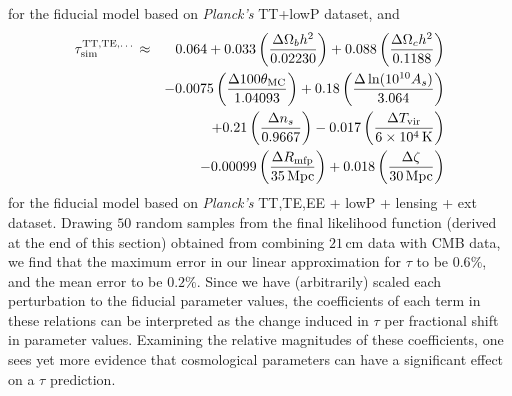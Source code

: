 \documentclass[twocolumn,aps,prd,nofootinbib,showpacs,superscriptaddress]{revtex4-1}
\begin{document}
for the fiducial model based on \emph{Planck's} TT+lowP dataset, and
\begin{eqnarray}
\label{eq:TTTEEE_linearTau}
\tau_\textrm{sim}^\textrm{TT,TE,\dots} \approx &&\, 0.064 + 0.033  \left(\frac{\Delta\Omega_b h^2}{0.02230}\right) + 0.088\left(\frac{\Delta\Omega_c h^2}{0.1188}\right) \nonumber\\ 
&&  -0.0075 \left(\frac{\Delta100\theta_\textrm{MC}}{1.04093}\right) +   0.18\left(\frac{\Delta\ln (10^{10} A_s)}{3.064}\right)\nonumber \\
&& +   0.21 \left(\frac{\Delta n_s}{0.9667}\right)  -0.017 \left(\frac{\Delta T_\textrm{vir}}{6 \times 10^4\,\textrm{K}}\right)\nonumber \\
&& -0.00099 \left(\frac{\Delta R_\textrm{mfp}}{35\,\textrm{Mpc}}\right) +  0.018 \left(\frac{\Delta \zeta}{30\,\textrm{Mpc}}\right)
\end{eqnarray}
for the fiducial model based on \emph{Planck's} TT,TE,EE + lowP + lensing + ext dataset. Drawing $50$ random samples from the final likelihood function (derived at the end of this section) obtained from combining $21\,\textrm{cm}$ data with CMB data, we find that the maximum error in our linear approximation for $\tau$ to be $0.6\%$, and the mean error to be $0.2\%$. Since we have (arbitrarily) scaled each perturbation to the fiducial parameter values, the coefficients of each term in these relations can be interpreted as the change induced in $\tau$ per fractional shift in parameter values. Examining the relative magnitudes of these coefficients, one sees yet more evidence that cosmological parameters can have a significant effect on a $\tau$ prediction.
\end{document}
